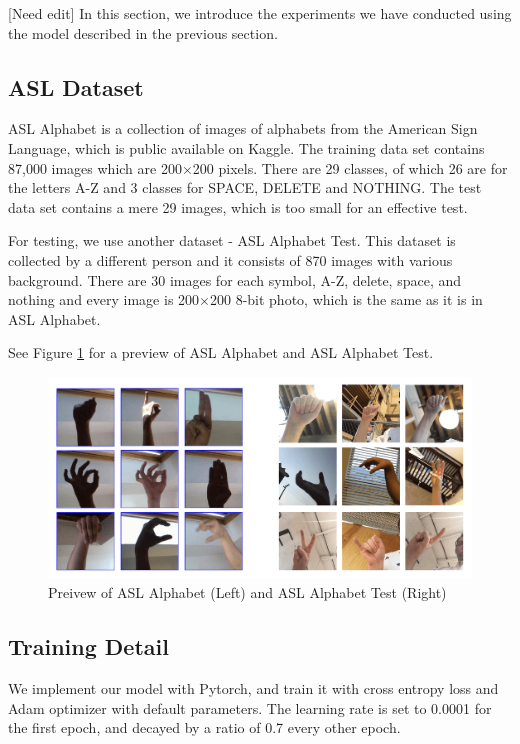 \documentclass[10pt,twocolumn,letterpaper]{article}
\begin{document}
[Need edit] In this section, we introduce the experiments we have conducted using the model described in the previous section.

\subsection{ASL Dataset}

ASL Alphabet\cite{noauthor_asl_nodate} is a collection of images of alphabets from the American Sign Language, which is public available on Kaggle. The training data set contains 87,000 images which are 200$\times$200 pixels. There are 29 classes, of which 26 are for the letters A-Z and 3 classes for SPACE, DELETE and NOTHING. The test data set contains a mere 29 images, which is too small for an effective test.

For testing, we use another dataset - ASL Alphabet Test\cite{noauthor_asl_nodate-1}. This dataset is collected by a different person and it consists of 870 images with various background. There are 30 images for each symbol, A-Z, delete, space, and nothing and every image is 200$\times$200 8-bit photo, which is the same as it is in ASL Alphabet. 

See Figure \ref{fig:asl} for a preview of ASL Alphabet and ASL Alphabet Test.

\begin{figure}[h]
\begin{center}
\includegraphics[width=0.8\linewidth]{imgs/asl-cmp.png}
\end{center}
\caption{Preivew of ASL Alphabet (Left) and ASL Alphabet Test (Right)}
\label{fig:asl}
\end{figure}

\subsection{Training Detail}\label{sec:training_detail}

We implement our model with Pytorch, and train it with cross entropy loss and Adam optimizer\cite{kingma2014adam} with default parameters. The learning rate is set to 0.0001 for the first epoch, and decayed by a ratio of 0.7 every other epoch. 
\end{document}
